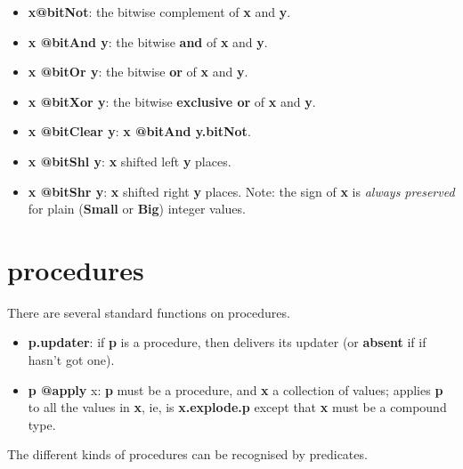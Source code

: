 \documentclass{report}
\begin{document}
\begin{itemize}\item {\bf x@bitNot}: the bitwise complement of {\bf x} and {\bf y}.

\item {\bf x @bitAnd y}: the bitwise {\bf and} of {\bf x} and {\bf y}.

\item {\bf x @bitOr y}: the bitwise {\bf or} of {\bf x} and {\bf y}.

\item {\bf x @bitXor y}: the bitwise {\bf exclusive or} of {\bf x} and {\bf y}.

\item {\bf x @bitClear y}: {\bf x @bitAnd y.bitNot}.

\item {\bf x @bitShl y}: {\bf x} shifted left {\bf y} places.

\item {\bf x @bitShr y}: {\bf x} shifted right {\bf y} places. Note: the sign of {\bf x} is {\em always
preserved} for plain ({\bf Small} or {\bf Big}) integer values.

\end{itemize}\section{procedures}


There are several standard functions on procedures.

\begin{itemize}\item {\bf p.updater}: if {\bf p} is a procedure, then delivers its updater (or {\bf absent} if
if hasn't got one).

\item {\bf p @apply }x: {\bf p} must be a procedure, and {\bf x} a collection of values; applies
{\bf p} to all the values in {\bf x}, ie, is {\bf x.explode.p} except that {\bf x} must be a
compound type.

\end{itemize}The different kinds of procedures can be recognised by predicates.
\end{document}
